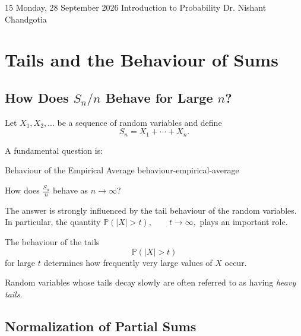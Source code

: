 
\lecture
{15}
{Monday, 28 September 2026}
{Introduction to Probability}
{Dr. Nishant Chandgotia}



\section{Tails and the Behaviour of Sums}

\subsection{How Does \(S_n/n\) Behave for Large \(n\)?}

Let
\(
X_1,X_2,\ldots
\)
be a sequence of random variables and define
\[
S_n=X_1+\cdots+X_n.
\]

A fundamental question is:

\begin{question}{Behaviour of the Empirical Average}
{behaviour-empirical-average}

How does
\(
\frac{S_n}{n}
\)
behave as $n\to\infty$?

\end{question}

The answer is strongly influenced by the tail behaviour of the
random variables. In particular, the quantity
\(
\mathbb{P}(|X|>t),
\qquad t\to\infty,
\)
plays an important role.

\begin{observation}

The behaviour of the tails
\[
\mathbb{P}(|X|>t)
\]
for large $t$ determines how frequently very large values of $X$
occur.

Random variables whose tails decay slowly are often referred to as
having \emph{heavy tails}.

\end{observation}



\subsection{Normalization of Partial Sums}

